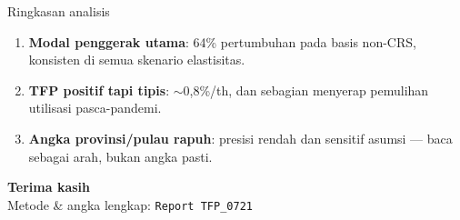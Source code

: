 \documentclass[aspectratio=169,11pt]{beamer}
\newcommand{\key}[1]{{\color{aksen}\textbf{#1}}}
\begin{document}
\begin{frame}{Ringkasan analisis}
  \large
  \begin{enumerate}
    \setlength\itemsep{0.8em}
    \item \key{Modal penggerak utama}: 64\% pertumbuhan pada basis non-CRS, konsisten di semua skenario elastisitas.
    \item \key{TFP positif tapi tipis}: $\sim$0,8\%/th, dan sebagian menyerap pemulihan utilisasi pasca-pandemi.
    \item \key{Angka provinsi/pulau rapuh}: presisi rendah dan sensitif asumsi --- baca sebagai arah, bukan angka pasti.
  \end{enumerate}
\end{frame}

\begin{frame}[plain]
  \centering\vfill
  {\color{aksen}\Huge \textbf{Terima kasih}}\\[1em]
  {\color{abu}\large Metode \& angka lengkap: \texttt{Report TFP\_0721}}
  \vfill
\end{frame}
\end{document}
